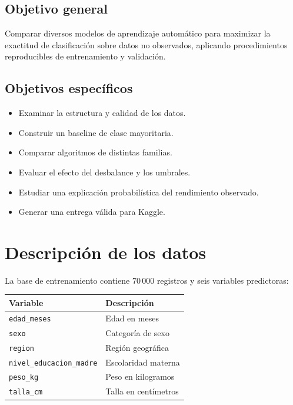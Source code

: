 ﻿\documentclass[11pt,a4paper]{article}
\begin{document}
\subsection{Objetivo general}

Comparar diversos modelos de aprendizaje automático
para maximizar la exactitud de clasificación sobre
datos no observados, aplicando procedimientos
reproducibles de entrenamiento y validación.

\subsection{Objetivos específicos}

\begin{itemize}
\item Examinar la estructura y calidad de los datos.
\item Construir un baseline de clase mayoritaria.
\item Comparar algoritmos de distintas familias.
\item Evaluar el efecto del desbalance y los umbrales.
\item Estudiar una explicación probabilística
      del rendimiento observado.
\item Generar una entrega válida para Kaggle.
\end{itemize}

\section{Descripción de los datos}

La base de entrenamiento contiene 70\,000 registros
y seis variables predictoras:

\begin{center}
\begin{tabular}{ll}
\toprule
Variable & Descripción\\
\midrule
\texttt{edad\_meses} & Edad en meses\\
\texttt{sexo} & Categoría de sexo\\
\texttt{region} & Región geográfica\\
\texttt{nivel\_educacion\_madre} & Escolaridad materna\\
\texttt{peso\_kg} & Peso en kilogramos\\
\texttt{talla\_cm} & Talla en centímetros\\
\bottomrule
\end{tabular}
\end{center}
\end{document}
